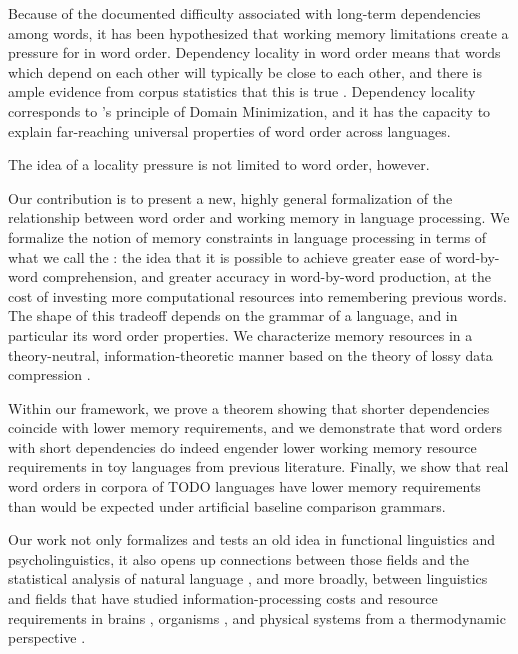 Because of the documented difficulty associated with long-term dependencies among words, it has been hypothesized that working memory limitations create a pressure for  in word order. Dependency locality in word order means that words which depend on each other will typically be close to each other, and there is ample evidence from corpus statistics that this is true \citep[for recent reviews of this idea and the evidence for it, see][]{liu-dependency-2017,temperley-minimizing-2018}. Dependency locality corresponds to \citet{hawkins2004efficiency}'s principle of Domain Minimization, and it has the capacity to explain far-reaching universal properties of word order across languages.

The idea of a locality pressure is not limited to word order, however. 

Our contribution is to present a new, highly general formalization of the relationship between word order and working memory in language processing. We formalize the notion of memory constraints in language processing in terms of what we call the : the idea that it is possible to achieve greater ease of word-by-word comprehension, and greater accuracy in word-by-word production, at the cost of investing more computational resources into remembering previous words.
The shape of this tradeoff depends on the grammar of a language, and in particular its word order properties.
We characterize memory resources in a theory-neutral, information-theoretic manner based on the theory of lossy data compression \citep{cover2006elements,berger}. %


Within our framework, we prove a theorem showing that shorter dependencies coincide with lower memory requirements, and we demonstrate that word orders with short dependencies do indeed engender lower working memory resource requirements in toy languages from previous literature. Finally, we show that real word orders in corpora of TODO languages have lower memory requirements than would be expected under artificial baseline comparison grammars. 

Our work not only formalizes and tests an old idea in functional linguistics and psycholinguistics, it also opens up connections between those fields and the statistical analysis of natural language \citep{debowski-excess-2011,bentz2017word,lin-critical-2017}, and more broadly, between linguistics and fields that have studied information-processing costs and resource requirements in brains \citep{friston}, organisms \citep{england}, and physical systems from a thermodynamic perspective \citep{still2012thermodynamic}. %








